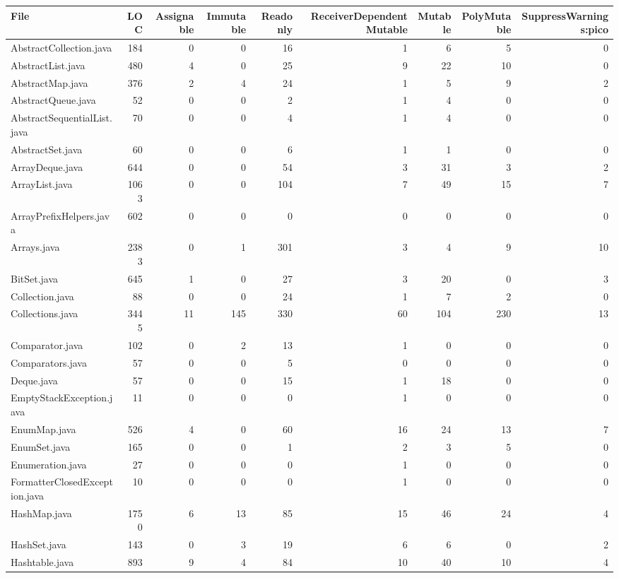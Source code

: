 \begin{table}[h]
\centering
\begin{tabular}{lrrrrrrrr}
\hline
File & LOC & Assignable & Immutable & Readonly & ReceiverDependentMutable & Mutable & PolyMutable & SuppressWarnings:pico \\
\hline
AbstractCollection.java & 184 & 0 & 0 & 16 & 1 & 6 & 5 & 0 \\
AbstractList.java & 480 & 4 & 0 & 25 & 9 & 22 & 10 & 0 \\
AbstractMap.java & 376 & 2 & 4 & 24 & 1 & 5 & 9 & 2 \\
AbstractQueue.java & 52 & 0 & 0 & 2 & 1 & 4 & 0 & 0 \\
AbstractSequentialList.java & 70 & 0 & 0 & 4 & 1 & 4 & 0 & 0 \\
AbstractSet.java & 60 & 0 & 0 & 6 & 1 & 1 & 0 & 0 \\
ArrayDeque.java & 644 & 0 & 0 & 54 & 3 & 31 & 3 & 2 \\
ArrayList.java & 1063 & 0 & 0 & 104 & 7 & 49 & 15 & 7 \\
ArrayPrefixHelpers.java & 602 & 0 & 0 & 0 & 0 & 0 & 0 & 0 \\
Arrays.java & 2383 & 0 & 1 & 301 & 3 & 4 & 9 & 10 \\
BitSet.java & 645 & 1 & 0 & 27 & 3 & 20 & 0 & 3 \\
Collection.java & 88 & 0 & 0 & 24 & 1 & 7 & 2 & 0 \\
Collections.java & 3445 & 11 & 145 & 330 & 60 & 104 & 230 & 13 \\
Comparator.java & 102 & 0 & 2 & 13 & 1 & 0 & 0 & 0 \\
Comparators.java & 57 & 0 & 0 & 5 & 0 & 0 & 0 & 0 \\
Deque.java & 57 & 0 & 0 & 15 & 1 & 18 & 0 & 0 \\
EmptyStackException.java & 11 & 0 & 0 & 0 & 1 & 0 & 0 & 0 \\
EnumMap.java & 526 & 4 & 0 & 60 & 16 & 24 & 13 & 7 \\
EnumSet.java & 165 & 0 & 0 & 1 & 2 & 3 & 5 & 0 \\
Enumeration.java & 27 & 0 & 0 & 0 & 1 & 0 & 0 & 0 \\
FormatterClosedException.java & 10 & 0 & 0 & 0 & 1 & 0 & 0 & 0 \\
HashMap.java & 1750 & 6 & 13 & 85 & 15 & 46 & 24 & 4 \\
HashSet.java & 143 & 0 & 3 & 19 & 6 & 6 & 0 & 2 \\
Hashtable.java & 893 & 9 & 4 & 84 & 10 & 40 & 10 & 4 \\

\end{tabular}
\end{table}
